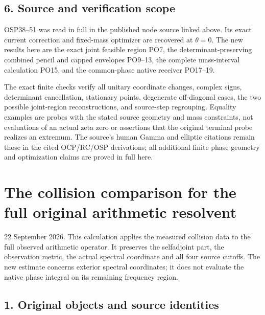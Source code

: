 \documentclass[11pt]{article}
\begin{document}
\subsection{6. Source and verification scope}\label{part1-source-and-verification-scope}

OSP38--51 was read in full in the published node source linked above. Its exact current correction and fixed-mass optimizer are recovered at \(\theta=0\). The new results here are the exact joint feasible region PO7, the determinant-preserving combined pencil and capped envelopes PO9--13, the complete mass-interval calculation PO15, and the common-phase native receiver PO17--19.

The exact finite checks verify all unitary coordinate changes, complex signs, determinant cancellation, stationary points, degenerate off-diagonal cases, the two possible joint-region reconstructions, and source-step regrouping. Equality examples are probes with the stated source geometry and mass constraints, not evaluations of an actual zeta zero or assertions that the original terminal probe realizes an extremum. The source's human Gamma and elliptic citations remain those in the cited OCP/RC/OSP derivations; all additional finite phase geometry and optimization claims are proved in full here.

\clearpage
\section{The collision comparison for the full original arithmetic resolvent}\label{part2-the-collision-comparison-for-the-full-original-arithmetic-resolvent}

22 September 2026. This calculation applies the measured collision data to the full observed arithmetic operator. It preserves the selfadjoint part, the observation metric, the actual spectral coordinate and all four source cutoffs. The new estimate concerns exterior spectral coordinates; it does not evaluate the native phase integral on its remaining frequency region.

\subsection{1. Original objects and source identities}\label{part2-original-objects-and-source-identities}
\end{document}
